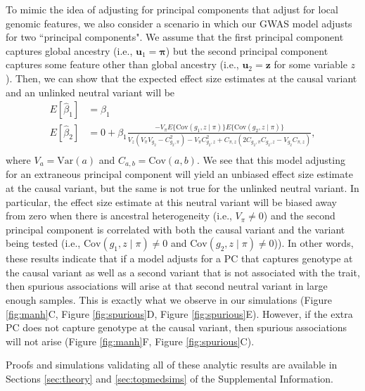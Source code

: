 \documentclass[12pt]{article}
\begin{document}
To mimic the idea of adjusting for principal components that adjust for local genomic features, we also consider a scenario in which our GWAS model adjusts for two ``principal components".
We assume that the first principal component captures global ancestry (i.e., $\mathbf{u}_1 = \boldsymbol\pi$) but the second principal component captures some feature other than global ancestry (i.e., $\mathbf{u}_2 = \mathbf{z}$ for some variable $z$).
Then, we can show that the expected effect size estimates at the causal variant and an unlinked neutral variant will be
\begin{equation}
\begin{aligned}
E[\hat\beta_1] & = \beta_1 \\
E[\hat\beta_2] & = 0 + \beta_1 \frac{-V_\pi E\{\text{Cov}(g_1, z \mid \pi)\} E\{\text{Cov}(g_2, z \mid \pi)\}}{V_z(V_\pi V_{g_2} - C_{g_2,\pi}^2) - V_\pi C_{g_2,z}^2 + C_{\pi, z}(2C_{g_2,\pi} C_{g_2,z} - V_{g_2}C_{\pi,z})}, \\
\end{aligned}
\label{eqn:collider}
\end{equation}
where $V_a = \text{Var}(a)$ and $C_{a,b} = \text{Cov}(a,b)$.
We see that this model adjusting for an extraneous principal component will yield an unbiased effect size estimate at the causal variant, but the same is not true for the unlinked neutral variant.
In particular, the effect size estimate at this neutral variant will be biased away from zero when there is  ancestral heterogeneity (i.e., $V_\pi \neq 0$) and the second principal component is correlated with both the causal variant and the variant being tested (i.e., $\text{Cov}(g_1, z \mid \pi) \neq 0$ and $\text{Cov}(g_2, z \mid \pi) \neq 0$)).
In other words, these results indicate that if a model adjusts for a PC that captures genotype at the causal variant as well as a second variant that is not associated with the trait, then spurious associations will arise at that second neutral variant in large enough samples.
This is exactly what we observe in our simulations (Figure \ref{fig:manh}C, Figure \ref{fig:spurious}D,  Figure \ref{fig:spurious}E).
However, if the extra PC does not capture genotype at the causal variant, then spurious associations will not arise (Figure \ref{fig:manh}F, Figure \ref{fig:spurious}C).

% 
Proofs and simulations validating all of these analytic results are available in Sections \ref{sec:theory} and \ref{sec:topmedsims} of the Supplemental Information.
\end{document}
